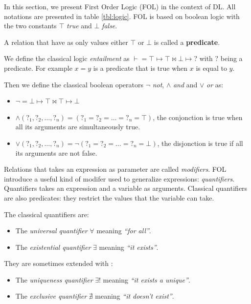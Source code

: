 \documentclass[11pt,a4paper,twoside,openright,titlepage,numbers=noenddot,headinclude,cleardoublepage=empty,openany]{scrreprt}
\theoremstyle{plain}
\theoremstyle{definition}
\theoremstyle{remark}
\providecommand{\tightlist}{%
  \setlength{\itemsep}{0pt}\setlength{\parskip}{0pt}}
\begin{document}
In this section, we present First Order Logic (FOL) in the context of
DL. All notations are presented in table \ref{tbl:logic}. FOL is based
on boolean logic with the two constants \(\top\) \emph{true} and
\(\bot\) \emph{false}.

A relation that have as only values either \(\top\) or \(\bot\) is
called a \textbf{predicate}.

We define the classical logic \emph{entailment} as
\(\vdash = \top \mapsto \top \bowtie \bot \mapsto ?\) with \(?\) being a
predicate. For example \(x = y\) is a predicate that is true when \(x\)
is equal to \(y\).

Then we define the classical boolean operators \(\lnot\) \emph{not},
\(\land\) \emph{and} and \(\lor\) \emph{or} as:

\begin{itemize}
\tightlist
\item
  \(\lnot = \bot \mapsto \top \bowtie \top \mapsto \bot\)
\item
  \(\land(?_1, ?_2, …, ?_n) = (?_1 = ?_2 = … = ?_n = \top)\), the
  conjonction is true when all its arguments are simultaneously true.
\item
  \(\lor(?_1, ?_2, …, ?_n) = \lnot(?_1 = ?_2 = … = ?_n = \bot)\), the
  disjonction is true if all its arguments are not false.
\end{itemize}

Relations that takes an expression as parameter are called
\emph{modifiers}. FOL introduce a useful kind of modifer used to
generalize expressions: \emph{quantifiers}. Quantifiers takes an
expression and a variable as arguments. Classical quantifiers are also
predicates: they restrict the values that the variable can take.

The classical quantifiers are:

\begin{itemize}
\tightlist
\item
  The \emph{universal quantifier} \(\forall\) meaning \emph{``for
  all''}.
\item
  The \emph{existential quantifier} \(\exists\) meaning \emph{``it
  exists''}.
\end{itemize}

They are sometimes extended with :

\begin{itemize}
\tightlist
\item
  The \emph{uniqueness quantifier} \(\exists!\) meaning \emph{``it
  exists a unique''}.
\item
  The \emph{exclusive quantifier} \(\nexists\) meaning \emph{``it
  doesn't exist''}.
\end{itemize}
\end{document}
